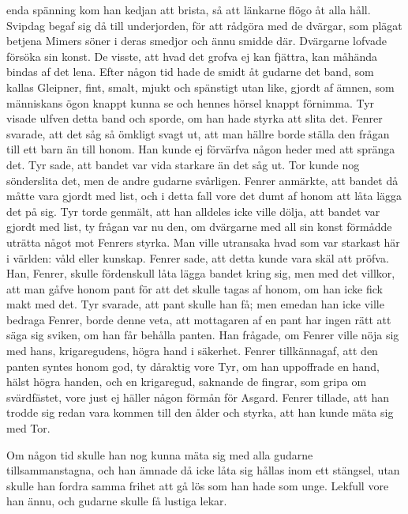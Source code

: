 enda spänning kom han kedjan att brista, så att länkarne flögo åt alla
håll. Svipdag begaf sig då till underjorden, för att rådgöra med de
dvärgar, som plägat betjena Mimers söner i deras smedjor och ännu smidde
där. Dvärgarne lofvade försöka sin konst. De visste, att hvad det grofva
ej kan fjättra, kan måhända bindas af det lena. Efter någon tid hade de
smidt åt gudarne det band, som kallas Gleipner, fint, smalt, mjukt och
spänstigt utan like, gjordt af ämnen, som människans ögon knappt kunna
se och hennes hörsel knappt förnimma. Tyr visade ulfven detta band och
sporde, om han hade styrka att slita det. Fenrer svarade, att det såg så
ömkligt svagt ut, att man hällre borde ställa den frågan till ett barn
än till honom. Han kunde ej förvärfva någon heder med att spränga det.
Tyr sade, att bandet var vida starkare än det såg ut. Tor kunde nog
sönderslita det, men de andre gudarne svårligen. Fenrer anmärkte, att
bandet då måtte vara gjordt med list, och i detta fall vore det dumt af
honom att låta lägga det på sig. Tyr torde genmält, att han alldeles
icke ville dölja, att bandet var gjordt med list, ty frågan var nu den,
om dvärgarne med all sin konst förmådde uträtta något mot Fenrers
styrka. Man ville utransaka hvad som var starkast här i världen: våld
eller kunskap. Fenrer sade, att detta kunde vara skäl att pröfva. Han,
Fenrer, skulle fördenskull låta lägga bandet kring sig, men med det
villkor, att man gåfve honom pant för att det skulle tagas af honom, om
han icke fick makt med det. Tyr svarade, att pant skulle han få; men
emedan han icke ville bedraga Fenrer, borde denne veta, att mottagaren
af en pant har ingen rätt att säga sig sviken, om han får behålla
panten. Han frågade, om Fenrer ville nöja sig med hans, krigaregudens,
högra hand i säkerhet. Fenrer tillkännagaf, att den panten syntes honom
god, ty dåraktig vore Tyr, om han uppoffrade en hand, hälst högra
handen, och en krigaregud, saknande de fingrar, som gripa om
svärdfästet, vore just ej häller någon förmån för Asgard. Fenrer
tillade, att han trodde sig redan vara kommen till den ålder och styrka,
att han kunde mäta sig med Tor.

Om någon tid skulle han nog kunna mäta sig med alla gudarne
tillsammanstagna, och han ämnade då icke låta sig hållas inom ett
stängsel, utan skulle han fordra samma frihet att gå lös som han hade
som unge. Lekfull vore han ännu, och gudarne skulle få lustiga lekar.

